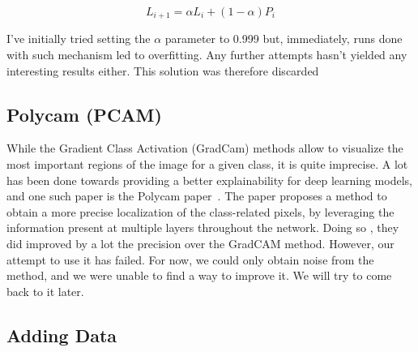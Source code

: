 \documentclass[11pt]{article}
\begin{document}
        \begin{equation}
            L_{i+1} = \alpha L_i + (1 - \alpha) P_{i}
        \end{equation}


        I've initially tried setting the $\alpha$ parameter to 0.999 but, immediately, runs done with such mechanism led to overfitting. Any further
        attempts hasn't yielded any interesting results either. This solution was therefore discarded

%

    \subsection{Polycam (PCAM)}

    While the Gradient Class Activation (GradCam) methods allow to visualize the most important regions of the image for a given class, it is quite imprecise. A lot has been done towards
    providing a better explainability for deep learning models, and one such paper is the Polycam paper~\cite{polycam}. The paper proposes a method to obtain a more precise localization of the
    class-related pixels, by leveraging the information present at multiple layers throughout the network. Doing so , they did improved by a lot the precision
    over the GradCAM method. However, our attempt to use it has failed. For now, we could only obtain noise from the method, and we were unable to find a way to improve it. We will try to
    come back to it later.

    \subsection{Adding Data}
\end{document}

